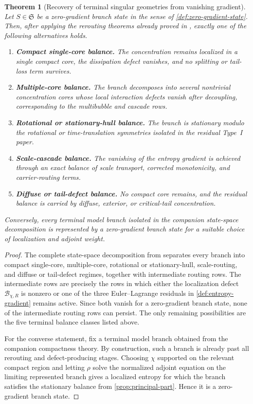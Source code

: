 \documentclass[11pt]{amsart}
\numberwithin{equation}{section}
\theoremstyle{plain}
\newtheorem{theorem}{Theorem}[section]
\theoremstyle{definition}
\theoremstyle{remark}
\newcommand{\State}{\mathfrak S}
\begin{document}
\begin{theorem}[Recovery of terminal singular geometries from vanishing gradient]
\label{thm:zero-gradient-recovery}
Let \(S\in\State\) be a zero-gradient branch state in the sense of
\cref{def:zero-gradient-state}.  Then, after applying the rerouting theorems
already proved in \cite{BallesterSetup,BallesterResidual,BallesterTypeII},
exactly one of the following alternatives holds.
\begin{enumerate}[label=\textup{(\arabic*)},leftmargin=2.2em]
	\item \textbf{Compact single-core balance.}
	The concentration remains localized in a single compact core, the dissipation
	defect vanishes, and no splitting or tail-loss term survives.
	\item \textbf{Multiple-core balance.}
	The branch decomposes into several nontrivial concentration cores whose local
	interaction defects vanish after decoupling, corresponding to the multibubble
	and cascade rows.
	\item \textbf{Rotational or stationary-hull balance.}
	The branch is stationary modulo the rotational or time-translation symmetries
	isolated in the residual Type~I paper.
	\item \textbf{Scale-cascade balance.}
	The vanishing of the entropy gradient is achieved through an exact balance of
	scale transport, corrected monotonicity, and carrier-routing terms.
	\item \textbf{Diffuse or tail-defect balance.}
	No compact core remains, and the residual balance is carried by diffuse,
	exterior, or critical-tail concentration.
\end{enumerate}
Conversely, every terminal model branch isolated in the companion state-space
decomposition is represented by a zero-gradient branch state for a suitable
choice of localization and adjoint weight.
\end{theorem}

\begin{proof}
The complete state-space decomposition from
\cite{BallesterSetup,BallesterResidual,BallesterTypeII} separates every branch
into compact single-core, multiple-core, rotational or stationary-hull,
scale-routing, and diffuse or tail-defect regimes, together with intermediate
routing rows.  The intermediate rows are precisely the rows in which either the
localization defect \(\mathcal B_{\chi,R}\) is nonzero or one of the three
Euler--Lagrange residuals in \cref{def:entropy-gradient} remains active.  Since
both vanish for a zero-gradient branch state, none of the intermediate routing
rows can persist.  The only remaining possibilities are the five terminal
balance classes listed above.

For the converse statement, fix a terminal model branch obtained from the
companion compactness theory.  By construction, such a branch is already past
all rerouting and defect-producing stages.  Choosing \(\chi\) supported on the
relevant compact region and letting \(\rho\) solve the normalized adjoint
equation on the limiting represented branch gives a localized entropy for which
the branch satisfies the stationary balance from
\cref{prop:principal-part}.  Hence it is a zero-gradient branch state.
\end{proof}
\end{document}
